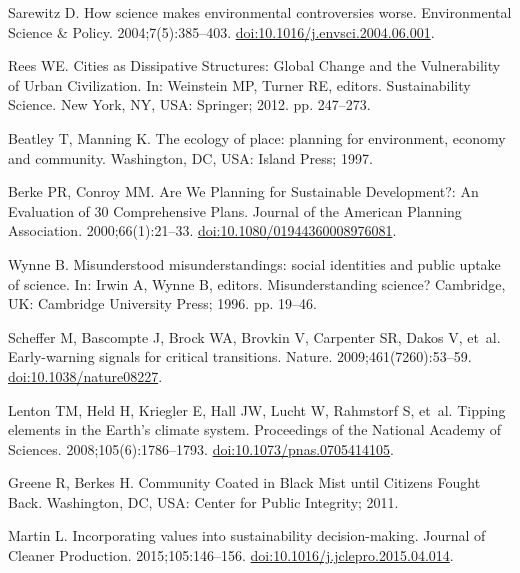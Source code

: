 \documentclass[10pt,a4paper]{article}
\begin{document}
\begin{multicols}{2}
\begin{footnotesize}
\begin{thebibliography}{100}
Sarewitz D.
\newblock How science makes environmental controversies worse.
\newblock Environmental Science \& Policy. 2004;7(5):385--403.
\newblock
  \href{https://doi.org/10.1016/j.envsci.2004.06.001}{doi:10.1016/j.envsci.2004.06.001}.

Rees WE.
\newblock Cities as {Dissipative} {Structures}: {Global} {Change} and the
  {Vulnerability} of {Urban} {Civilization}.
\newblock In: Weinstein MP, Turner RE, editors. Sustainability {Science}. New
  York, NY, USA: Springer; 2012. pp. 247--273.

Beatley T, Manning K.
\newblock The ecology of place: planning for environment, economy and
  community.
\newblock Washington, DC, USA: Island Press; 1997.

Berke PR, Conroy MM.
\newblock Are {We} {Planning} for {Sustainable} {Development}?: {An}
  {Evaluation} of 30 {Comprehensive} {Plans}.
\newblock Journal of the American Planning Association. 2000;66(1):21--33.
\newblock
  \href{https://doi.org/10.1080/01944360008976081}{doi:10.1080/01944360008976081}.

Wynne B.
\newblock Misunderstood misunderstandings: social identities and public uptake
  of science.
\newblock In: Irwin A, Wynne B, editors. Misunderstanding science? Cambridge,
  UK: Cambridge University Press; 1996. pp. 19--46.

Scheffer M, Bascompte J, Brock WA, Brovkin V, Carpenter SR, Dakos V, et~al.
\newblock Early-warning signals for critical transitions.
\newblock Nature. 2009;461(7260):53--59.
\newblock \href{https://doi.org/10.1038/nature08227}{doi:10.1038/nature08227}.

Lenton TM, Held H, Kriegler E, Hall JW, Lucht W, Rahmstorf S, et~al.
\newblock Tipping elements in the Earth's climate system.
\newblock Proceedings of the National Academy of Sciences.
  2008;105(6):1786--1793.
\newblock
  \href{https://doi.org/10.1073/pnas.0705414105}{doi:10.1073/pnas.0705414105}.

Greene R, Berkes H.
\newblock Community {Coated} in {Black} {Mist} until {Citizens} {Fought}
  {Back}.
\newblock Washington, DC, USA: Center for Public Integrity; 2011.

Martin L.
\newblock Incorporating values into sustainability decision-making.
\newblock Journal of Cleaner Production. 2015;105:146--156.
\newblock
  \href{https://doi.org/10.1016/j.jclepro.2015.04.014}{doi:10.1016/j.jclepro.2015.04.014}.


\end{thebibliography}
\end{footnotesize}
\end{multicols}
\end{document}
